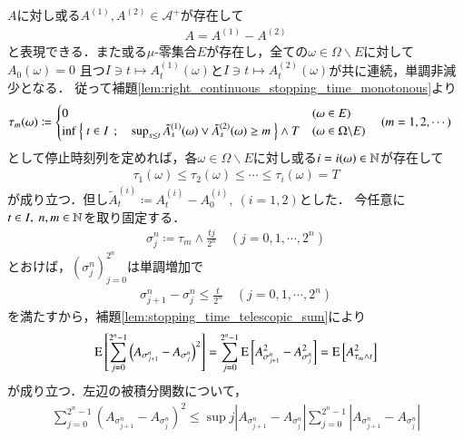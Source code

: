 	\begin{prf}
		$A$に対し或る$A^{(1)},A^{(2)} \in \mathcal{A}^+$が存在して
		\begin{align}
			A = A^{(1)} - A^{(2)}
		\end{align}
		と表現できる．また或る$\mu$-零集合$E$が存在し，全ての$\omega \in \Omega \backslash E$に対して$A_0(\omega) = 0$
		且つ$I \ni t \longmapsto A_t^{(1)}(\omega)$と$I \ni t \longmapsto A_t^{(2)}(\omega)$が共に連続，単調非減少となる．
		従って補題\ref{lem:right_continuous_stopping_time_monotonous}より
		\begin{align}
			\tau_m(\omega) &\coloneqq
			\begin{cases}
				0 & (\omega \in E) \\
				\operatorname*{inf}_{} \left\{\ t \in I\ \, ; \quad \operatorname*{sup}_{s \leq t} \tilde{A}_s^{(1)}(\omega) \vee \tilde{A}_s^{(2)}(\omega) \geq m\ \right\} \wedge T & (\omega \in \Omega \backslash E)
			\end{cases}
			\quad (m=1,2,\cdots)
		\end{align}
		として停止時刻列を定めれば，各$\omega \in \Omega \backslash E$に対し或る$i = i(\omega) \in \mathbb{N}$が存在して
		\begin{align}
			\tau_1(\omega) \leq \tau_2(\omega) \leq \cdots \leq \tau_i(\omega) = T
		\end{align}
		が成り立つ．但し$\tilde{A}_t^{(i)} \coloneqq A^{(i)}_t - A^{(i)}_0,\ (i=1,2)$とした．
		今任意に$t \in I,\ n,m \in \mathbb{N}$を取り固定する．
		\begin{align}
			\sigma_j^n \coloneqq \tau_m \wedge \frac{tj}{2^n} \quad (j = 0,1,\cdots, 2^n)
		\end{align}
		とおけば，$\left( \sigma_j^n \right)_{j=0}^{2^n}$は単調増加で
		\begin{align}
			\sigma_{j+1}^n - \sigma_j^n \leq \frac{t}{2^n} \quad (j=0,1,\cdots,2^n)
			\label{eq:prp_bounded_continuous_M_2c_path_1}
		\end{align}
		を満たすから，補題\ref{lem:stopping_time_telescopic_sum}により
		\begin{align}
			\operatorname{E} \left[ \sum_{j=0}^{2^n-1} \left( A_{\sigma_{j+1}^n} - A_{\sigma_j^n} \right)^2 \right]
			= \sum_{j=0}^{2^n-1} \operatorname{E} \left[ A_{\sigma_{j+1}^n}^2 - A_{\sigma_j^n}^2 \right]
			= \operatorname{E} \left[ A_{\tau_m \wedge t}^2 \right]
			\label{eq:prp_bounded_continuous_M_2c_path_2}
		\end{align}
		が成り立つ．左辺の被積分関数について，
		\begin{align}
			\sum_{j=0}^{2^n-1} \left( A_{\sigma_{j+1}^n} - A_{\sigma_j^n} \right)^2
			\leq \sup{j}{\left| A_{\sigma_{j+1}^n} - A_{\sigma_j^n} \right|} \sum_{j=0}^{2^n-1} \left| A_{\sigma_{j+1}^n} - A_{\sigma_j^n} \right|

\end{align}
\end{prf}

